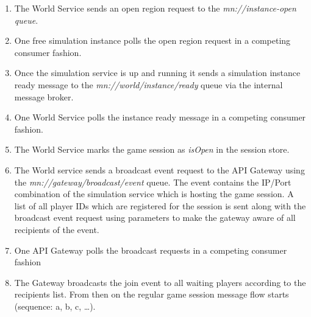 \begin{enumerate}[label=\Alph*.]
    \item The World Service sends an open region request to the
    \textit{mn://instance-open queue}.
    \item One free simulation instance polls the open region request in a
    competing consumer fashion.
    \item Once the simulation service is up and running it sends a simulation
    instance ready message to the \textit{mn://world/instance/ready} queue via
    the internal message broker.
    \item One World Service polls the instance ready message in a competing
    consumer fashion.
    \item The World Service marks the game session as \textit{isOpen} in the
    session store.
    \item The World service sends a broadcast event request to the API Gateway
    using the \textit{mn://gateway/broadcast/event} queue. The event contains
    the IP/Port combination of the simulation service which is hosting the
    game session. A list of all player IDs  which are registered for the
    session is sent along with the broadcast event request using parameters to
    make the gateway aware of all recipients of the event.
    \item One API Gateway polls the broadcast requests in a competing consumer
    fashion 
    \item The Gateway broadcasts the join event to all waiting players
    according to the recipients list. From then on the regular game session
    message flow starts (sequence: a, b, c, \ldots).
\end{enumerate}




